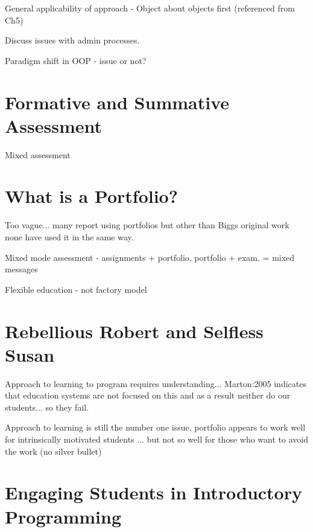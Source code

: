General applicability of approach - Object about objects first (referenced from Ch5)

Discuss issues with admin processes.

Paradigm shift in OOP
- issue or not?

\section{Formative and Summative Assessment} %
\label{sec:formative_and_summative_assessment}

Mixed assessment


\section{What is a Portfolio?} %
\label{sec:what_is_a_portfolio_}

Too vague... many report using portfolios but other than Biggs original work none have used it in the same way.


Mixed mode assessment - assignments + portfolio, portfolio + exam.
= mixed messages

Flexible education
- not factory model



\section{Rebellious Robert and Selfless Susan} %
\label{sec:rebellious_robert_and_selfless_susan}

Approach to learning to program requires understanding... Marton:2005 indicates that education systems are not focused on this and as a result neither do our students... so they fail.

Approach to learning is still the number one issue, portfolio appears to work well for intrinsically motivated students ... but not so well for those who want to avoid the work (no silver bullet)


\section{Engaging Students in Introductory Programming} %
\label{sec:engaging_students_in_introductory_programming}


